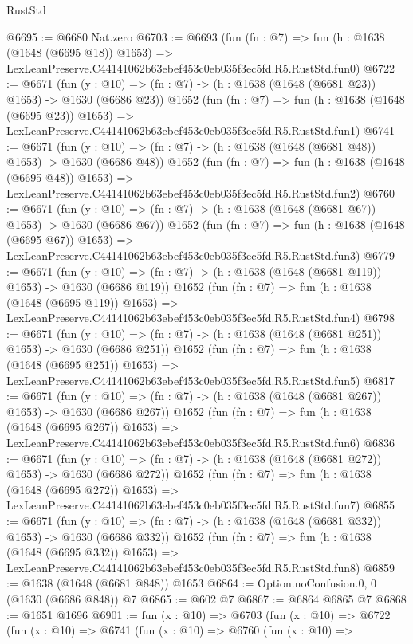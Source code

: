 \begin{lexlean}{RustStd}
\begin{coremodule}
@6695 := @6680 Nat.zero
@6703 := @6693
    (fun (fn : @7) =>
    fun (h : @1638 (@1648 (@6695 @18)) @1653) =>
    LexLeanPreserve.C44141062b63ebef453c0eb035f3ec5fd.R5.RustStd.fun0)
@6722 := @6671
    (fun (y : @10) => (fn : @7) -> (h : @1638 (@1648 (@6681 @23)) @1653) -> @1630 (@6686 @23))
    @1652
    (fun (fn : @7) =>
    fun (h : @1638 (@1648 (@6695 @23)) @1653) =>
    LexLeanPreserve.C44141062b63ebef453c0eb035f3ec5fd.R5.RustStd.fun1)
@6741 := @6671
    (fun (y : @10) => (fn : @7) -> (h : @1638 (@1648 (@6681 @48)) @1653) -> @1630 (@6686 @48))
    @1652
    (fun (fn : @7) =>
    fun (h : @1638 (@1648 (@6695 @48)) @1653) =>
    LexLeanPreserve.C44141062b63ebef453c0eb035f3ec5fd.R5.RustStd.fun2)
@6760 := @6671
    (fun (y : @10) => (fn : @7) -> (h : @1638 (@1648 (@6681 @67)) @1653) -> @1630 (@6686 @67))
    @1652
    (fun (fn : @7) =>
    fun (h : @1638 (@1648 (@6695 @67)) @1653) =>
    LexLeanPreserve.C44141062b63ebef453c0eb035f3ec5fd.R5.RustStd.fun3)
@6779 := @6671
    (fun (y : @10) => (fn : @7) -> (h : @1638 (@1648 (@6681 @119)) @1653) -> @1630 (@6686 @119))
    @1652
    (fun (fn : @7) =>
    fun (h : @1638 (@1648 (@6695 @119)) @1653) =>
    LexLeanPreserve.C44141062b63ebef453c0eb035f3ec5fd.R5.RustStd.fun4)
@6798 := @6671
    (fun (y : @10) => (fn : @7) -> (h : @1638 (@1648 (@6681 @251)) @1653) -> @1630 (@6686 @251))
    @1652
    (fun (fn : @7) =>
    fun (h : @1638 (@1648 (@6695 @251)) @1653) =>
    LexLeanPreserve.C44141062b63ebef453c0eb035f3ec5fd.R5.RustStd.fun5)
@6817 := @6671
    (fun (y : @10) => (fn : @7) -> (h : @1638 (@1648 (@6681 @267)) @1653) -> @1630 (@6686 @267))
    @1652
    (fun (fn : @7) =>
    fun (h : @1638 (@1648 (@6695 @267)) @1653) =>
    LexLeanPreserve.C44141062b63ebef453c0eb035f3ec5fd.R5.RustStd.fun6)
@6836 := @6671
    (fun (y : @10) => (fn : @7) -> (h : @1638 (@1648 (@6681 @272)) @1653) -> @1630 (@6686 @272))
    @1652
    (fun (fn : @7) =>
    fun (h : @1638 (@1648 (@6695 @272)) @1653) =>
    LexLeanPreserve.C44141062b63ebef453c0eb035f3ec5fd.R5.RustStd.fun7)
@6855 := @6671
    (fun (y : @10) => (fn : @7) -> (h : @1638 (@1648 (@6681 @332)) @1653) -> @1630 (@6686 @332))
    @1652
    (fun (fn : @7) =>
    fun (h : @1638 (@1648 (@6695 @332)) @1653) =>
    LexLeanPreserve.C44141062b63ebef453c0eb035f3ec5fd.R5.RustStd.fun8)
@6859 := @1638 (@1648 (@6681 @848)) @1653
@6864 := Option.noConfusion.{0, 0} (@1630 (@6686 @848)) @7
@6865 := @602 @7
@6867 := @6864 @6865 @7
@6868 := @1651 @1696
@6901 := fun (x : @10) =>
  @6703
    (fun (x : @10) =>
    @6722
      (fun (x : @10) =>
      @6741
        (fun (x : @10) =>
        @6760
          (fun (x : @10) =>

\end{coremodule}
\end{lexlean}

